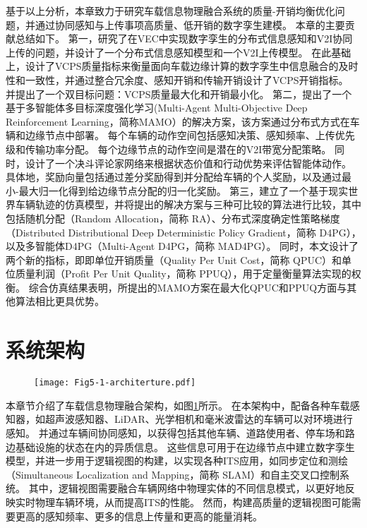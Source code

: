 基于以上分析，本章致力于研究车载信息物理融合系统的质量-开销均衡优化问题，并通过协同感知与上传事项高质量、低开销的数字孪生建模。
本章的主要贡献总结如下。
第一，研究了在VEC中实现数字孪生的分布式信息感知和V2I协同上传的问题，并设计了一个分布式信息感知模型和一个V2I上传模型。
在此基础上，设计了VCPS质量指标来衡量面向车载边缘计算的数字孪生中信息融合的及时性和一致性，并通过整合冗余度、感知开销和传输开销设计了VCPS开销指标。
并提出了一个双目标问题：VCPS质量最大化和开销最小化。
第二，提出了一个基于多智能体多目标深度强化学习(Multi-Agent Multi-Objective Deep Reinforcement Learning，简称MAMO）的解决方案，该方案通过分布式方式在车辆和边缘节点中部署。
每个车辆的动作空间包括感知决策、感知频率、上传优先级和传输功率分配。
每个边缘节点的动作空间是潜在的V2I带宽分配策略。
同时，设计了一个决斗评论家网络来根据状态价值和行动优势来评估智能体动作。
具体地，奖励向量包括通过差分奖励得到并分配给车辆的个人奖励，以及通过最小-最大归一化得到给边缘节点分配的归一化奖励。
第三，建立了一个基于现实世界车辆轨迹的仿真模型，并将提出的解决方案与三种可比较的算法进行比较，其中包括随机分配（Random Allocation，简称 RA）、分布式深度确定性策略梯度（Distributed Distributional Deep Deterministic Policy Gradient，简称 D4PG）\cite{barth2018distributed}，以及多智能体D4PG（Multi-Agent D4PG，简称 MAD4PG）。
同时，本文设计了两个新的指标，即即单位开销质量（Quality Per Unit Cost，简称 QPUC）和单位质量利润（Proﬁt Per Unit Quality，简称 PPUQ），用于定量衡量算法实现的权衡。
综合仿真结果表明，所提出的MAMO方案在最大化QPUC和PPUQ方面与其他算法相比更具优势。

\section{系统架构}\label{section 5-2}

\begin{figure}[h]
\centering
  \texttt{[image: Fig5-1-architerture.pdf]}
  \label{fig 5-1}
\end{figure} 

本章节介绍了车载信息物理融合架构，如图\ref{fig 5-1}所示。
在本架构中，配备各种车载感知器，如超声波感知器、LiDAR、光学相机和毫米波雷达的车辆可以对环境进行感知。
并通过车辆间协同感知，以获得包括其他车辆、道路使用者、停车场和路边基础设施的状态在内的异质信息。
这些信息可用于在边缘节点中建立数字孪生模型，并进一步用于逻辑视图的构建，以实现各种ITS应用，如同步定位和测绘（Simultaneous Localization and Mapping，简称 SLAM）和自主交叉口控制系统。
其中，逻辑视图需要融合车辆网络中物理实体的不同信息模式，以更好地反映实时物理车辆环境，从而提高ITS的性能。
然而，构建高质量的逻辑视图可能需要更高的感知频率、更多的信息上传量和更高的能量消耗。

